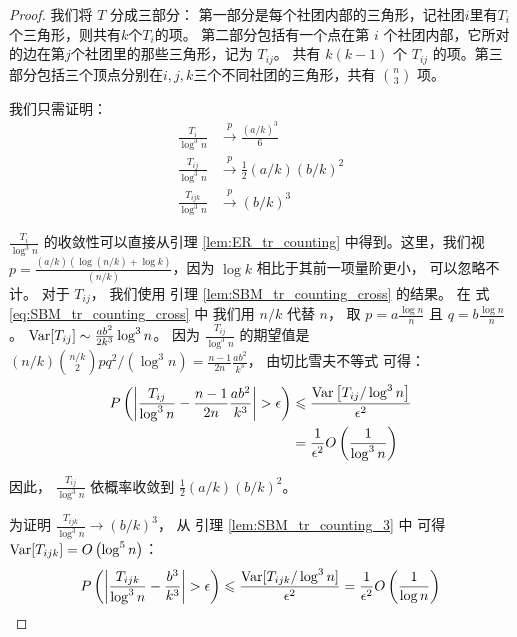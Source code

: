 \begin{proof}
 我们将 $T$ 分成三部分：
 第一部分是每个社团内部的三角形，记社团$i$里有$T_i$个三角形，则共有$k$个$T_i$的项。
 第二部分包括有一个点在第 $i$ 个社团内部，它所对的边在第$j$个社团里的那些三角形，记为 $T_{ij}$。
 共有 $k(k-1)$ 个 $T_{ij}$ 的项。第三部分包括三个顶点分别在$i,j,k$三个不同社团的三角形，共有
 $\binom{n}{3}$ 项。
	
	我们只需证明：
\begin{align}
	\frac{T_i}{\log ^3 n} &\xrightarrow{p} \frac{(a/k)^3}{6} \\
	\frac{T_{ij}}{\log^3 n}& \xrightarrow{p}\frac{1}{2}(a/k)(b/k)^2\\
	\frac{T_{ijk}}{\log^3 n} & \xrightarrow{p} (b/k)^3
	\end{align}
	
	$\frac{T_i}{\log ^3 n}$ 的收敛性可以直接从引理
 \ref{lem:ER_tr_counting} 中得到。这里，我们视$p=\frac{(a/k) (
    \log (n/k) + \log k)}{(n/k)}$，因为 $\log k$ 相比于其前一项量阶更小，
    可以忽略不计。
	对于 $T_{ij}$， 我们使用 
  引理 \ref{lem:SBM_tr_counting_cross}  的结果。
	在 式\eqref{eq:SBM_tr_counting_cross} 中
  我们用 $n/k$ 代替 $n$， 取 $p=a\frac{\log n}{n}$ 且 $q=b\frac{\log n}{n}$。
	$\operatorname{\mathrm{Var}}[T_{ij}] \sim \frac{ab^2}{2k^3} \log^3 n$。
  因为 $\frac{T_{ij}}{\log^3 n}$ 的期望值是
  $(n/k)\binom{n/k}{2}pq^2/(\log^3 n)
	=\frac{n-1}{2n}\frac{ab^2}{k^3}$， 由切比雪夫不等式
  可得：
	\begin{align*}
	P \left( \left|\frac{T_{ij}}{\log^3 n} - \frac{n-1}{2n}\frac{ab^2}{k^3} \right| > \epsilon
  \right) &\leqslant \frac{\operatorname{\mathrm{Var}}\left[T_{ij} / \log^3 n \right]}{\epsilon^2} \\
	& = \frac{1}{\epsilon^2}
	O \left( \frac{1}{\log^3 n} \right)
	\end{align*}
	
	因此， $\frac{T_{ij}}{\log^3 n} $ 依概率收敛到 $\frac{1}{2}(a/k)(b/k)^2$。
	
	为证明
  $\frac{T_{ijk}}{\log^3 n}\to (b/k)^3$，
  从 引理 \ref{lem:SBM_tr_counting_3} 中
  可得 $\operatorname{\mathrm{Var}}[T_{ijk}] = O\left(\log^5 n\right)$：
	$$
	P \left( \left|\frac{T_{ijk}}{\log^3 n} -\frac{b^3}{k^3} \right| > \epsilon
  \right) \leqslant \frac{\operatorname{\mathrm{Var}}[T_{ijk} / \log^3 n]}{\epsilon^2} = \frac{1}{\epsilon^2}
	O \left(\frac{1}{\log n} \right)
	$$
\end{proof}
